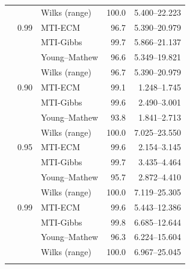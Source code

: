 \begin{longtable}{@{}rrlrr@{}}
 &  & Wilks (range) & 100.0 & 5.400--22.223 \\
\addlinespace[0.3em]
500 & 0.99 & MTI-ECM & 96.7 & 5.390--20.979 \\
 &  & MTI-Gibbs & 99.7 & 5.866--21.137 \\
 &  & Young--Mathew & 96.6 & 5.349--19.821 \\
 &  & Wilks (range) & 96.7 & 5.390--20.979 \\
\addlinespace[0.3em]
1000 & 0.90 & MTI-ECM & 99.1 & 1.248--1.745 \\
 &  & MTI-Gibbs & 99.6 & 2.490--3.001 \\
 &  & Young--Mathew & 93.8 & 1.841--2.713 \\
 &  & Wilks (range) & 100.0 & 7.025--23.550 \\
\addlinespace[0.3em]
1000 & 0.95 & MTI-ECM & 99.6 & 2.154--3.145 \\
 &  & MTI-Gibbs & 99.7 & 3.435--4.464 \\
 &  & Young--Mathew & 95.7 & 2.872--4.410 \\
 &  & Wilks (range) & 100.0 & 7.119--25.305 \\
\addlinespace[0.3em]
1000 & 0.99 & MTI-ECM & 99.6 & 5.443--12.386 \\
 &  & MTI-Gibbs & 99.8 & 6.685--12.644 \\
 &  & Young--Mathew & 96.3 & 6.224--15.604 \\
 &  & Wilks (range) & 100.0 & 6.967--25.045 \\
\addlinespace[0.3em]
\end{longtable}
\clearpage
